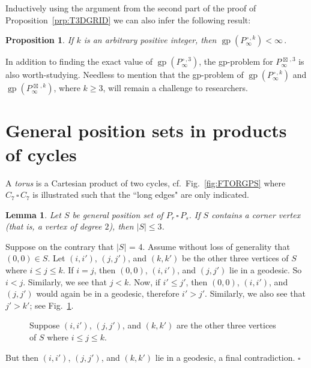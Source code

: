 \documentclass[12pt]{article}
\newtheorem{proposition}[theorem]{Proposition}
\newtheorem{lemma}[theorem]{Lemma}
\newcommand{\proof}{\noindent{\bf Proof.\ }}
\newcommand{\qed}{\hfill $\square$\medskip}
\def\cp{\,\square\,}
\def\sp{\,\boxtimes\,}
\DeclareMathOperator {\gp} {gp}
\begin{document}
Inductively using the argument from the second part of the proof of Proposition~\ref{prp:T3DGRID} we can also infer the following result:

\begin{proposition}
	\label{prp:TKDGRID} If $k$ is an arbitrary positive integer, then 
	$\gp(P_{\infty}^{\cp,k}) < \infty\,.$ 
\end{proposition} 

In addition to finding the exact value of $\gp(P_{\infty}^{\cp,3})$, the gp-problem for $P_{\infty}^{\sp,3}$ is also worth-studying. Needless to mention that the gp-problem of $\gp(P_{\infty}^{\cp,k})$ and  $\gp(P_{\infty}^{\sp,k})$, where $k\ge 3$, will remain a challenge to researchers.

\section{General position sets in products of cycles}
\label{sec:torus}

A {\em torus} is a Cartesian product of two cycles, cf.\ Fig.~\ref{fig:FTORGPS} where $C_7\cp C_7$ is illustrated such that the ``long edges" are only indicated. 

\begin{lemma}
	\label{lem:LGPS3}
	Let $S$ be general position set of $P_r\cp P_s$. If $S$ contains a corner vertex (that is, a vertex of degree $2$), then $|S| \leq 3$. 
\end{lemma}

\proof
Suppose on the contrary that $|S|$ = 4. Assume without loss of generality that $(0,0) \in S$. Let $(i,i')$, $(j,j')$, and $(k,k')$ be the other three vertices of $S$ where $i \leq j \leq k$.  
If $i = j$, then $(0,0)$, $(i,i')$, and $(j,j')$ lie in a geodesic. So $i < j$. Similarly, we see that $j < k$. Now, if $i' \leq j'$, then $(0,0)$, $(i,i')$, and $(j,j')$ would again be in a geodesic, therefore $i' > j'$. Similarly, we also see that $j' > k'$; see Fig.~\ref{fig:FLGPS3}. 

\begin{figure}[ht!]
	\begin{center}
	\end{center}
	\caption{Suppose $(i,i')$, $(j,j')$, and $(k,k')$ are the other three vertices of $S$ where $i \leq j \leq k$.}
	\label{fig:FLGPS3}
\end{figure}


But then $(i,i')$, $(j,j')$, and $(k,k')$ lie in a geodesic, a final contradiction.
\qed
\end{document}

